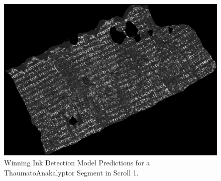 \documentclass[peerreview]{IEEEtran}
\begin{document}
\begin{figure}[!h]
\centering
\includegraphics[width=0.8\columnwidth]{predictions_scroll1_thaumato.jpg} 
\caption{Winning Ink Detection Model Predictions for a ThaumatoAnakalyptor Segment in Scroll 1.}
\label{prediction}
\end{figure}
\end{document}

